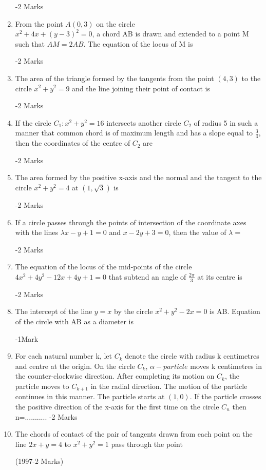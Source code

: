\documentclass[journal,12pt,twocolumn]{IEEEtran}
\begin{document}
\begin{enumerate}
\hfill{-2 Marks}
\item From the point $A(0,3)$ on the circle \\            $x^{2}+4x+(y-3)^{2}=0$, a chord AB is drawn and extended to a point M such that $AM=2AB$. The equation of the locus of M is \dotuline{\hspace{3cm}}

\hfill{-2 Marks}
\item The area of the triangle formed by the tangents from the point $(4,3)$ to the circle $x^{2}+y^{2}=9$ and the line joining their point of contact is \dotuline{\hspace{3cm}}

\hfill{-2 Marks}
\item If the circle $C_1:x^{2}+y^{2}=16$ intersects another circle $C_2$ of radius 5 in such a manner that common chord is of maximum length and has a slope equal to $\frac{3}{4}$, then the coordinates of the centre of $C_2$ are \dotuline{\hspace{3cm}}

\hfill{-2 Marks}
\item The area formed by the positive x-axis and the normal and the tangent to the circle $x^{2}+y^{2}=4$ at $(1,\sqrt{3})$ is \dotuline{\hspace{3cm}}

\hfill{-2 Marks}
\item If a circle passes through the points of intersection of the coordinate axes with the lines $\lambda x-y+1=0$ and $x-2y+3=0$, then the value of $\lambda =$ \dotuline{\hspace{3cm}}

\hfill{-2 Marks}
\item The equation of the locus of the mid-points of the circle $4x^{2}+4y^{2}-12x+4y+1=0$ that subtend an angle of $\frac{2\pi}{3}$ at its centre is \dotuline{\hspace{3cm}}

\hfill{-2 Marks}
\item The intercept of the line $y=x$ by the circle $x^{2}+y^{2}-2x=0$ is AB. Equation of the circle with AB as a diameter is \dotuline{\hspace{3cm}}

\hfill{-1Mark}
\item For each natural number k, let $C_k$ denote the circle with radius k centimetres and centre at the origin. On the circle $C_k$, $\alpha-particle$ moves k centimetres in the counter-clockwise direction. After completing its motion on $C_k$, the particle moves to $C_{k+1}$ in the radial direction. The motion of the particle continues in this manner. The particle starts at $(1,0)$. If the particle crosses the positive direction of the x-axis for the first time on the circle $C_n$ then n=...........
\hfill{-2 Marks}
\item The chords of contact of the pair of tangents drawn from each point on the line $2x+y=4$ to $x^{2}+y^{2}=1$ pass through the point \dotuline{\hspace{3cm}}

	\hfill{(1997-2 Marks)}
\end{enumerate}
\end{document}
